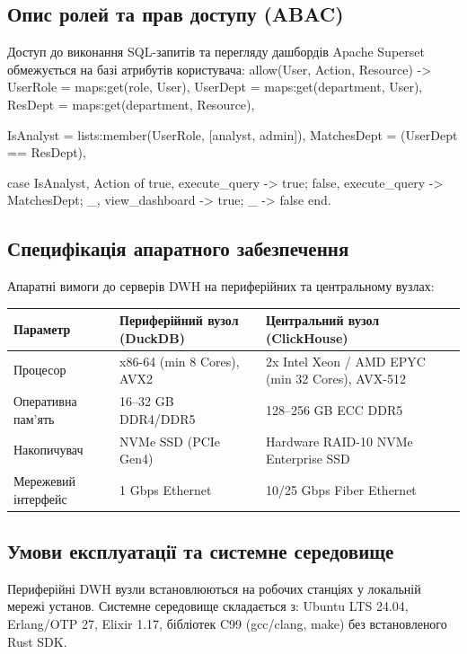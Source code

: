 \documentclass{article}
\let\originalfootnotesize\footnotesize
\let\oldverbatim\verbatim
\let\oldendverbatim\endverbatim
\renewenvironment{verbatim}{\originalfootnotesize\oldverbatim}{\oldendverbatim}
\begin{document}
\subsection{Опис ролей та прав доступу (ABAC)}
Доступ до виконання SQL-запитів та перегляду дашбордів Apache Superset обмежується на базі атрибутів користувача:
\begin{verbatim}
allow(User, Action, Resource) ->
    UserRole = maps:get(role, User),
    UserDept = maps:get(department, User),
    ResDept = maps:get(department, Resource),
    
    IsAnalyst = lists:member(UserRole, [analyst, admin]),
    MatchesDept = (UserDept == ResDept),
    
    case {IsAnalyst, Action} of
        {true, execute_query} -> true;
        {false, execute_query} -> MatchesDept;
        {_, view_dashboard} -> true;
        _ -> false
    end.
\end{verbatim}

\subsection{Специфікація апаратного забезпечення}
Апаратні вимоги до серверів DWH на периферійних та центральному вузлах:
\begin{center}
\small
\begin{longtable}{p{4cm} p{5cm} p{5cm}}
\toprule
\textbf{Параметр} & \textbf{Периферійний вузол (DuckDB)} & \textbf{Центральний вузол (ClickHouse)} \\
\midrule
Процесор & x86-64 (min 8 Cores), AVX2 & 2x Intel Xeon / AMD EPYC (min 32 Cores), AVX-512 \\
Оперативна пам'ять & 16--32 GB DDR4/DDR5 & 128--256 GB ECC DDR5 \\
Накопичувач & NVMe SSD (PCIe Gen4) & Hardware RAID-10 NVMe Enterprise SSD \\
Мережевий інтерфейс & 1 Gbps Ethernet & 10/25 Gbps Fiber Ethernet \\
\bottomrule
\end{longtable}
\end{center}

\subsection{Умови експлуатації та системне середовище}
Периферійні DWH вузли встановлюються на робочих станціях у локальній мережі установ. Системне середовище складається з: Ubuntu LTS 24.04, Erlang/OTP 27, Elixir 1.17, бібліотек C99 (gcc/clang, make) без встановленого Rust SDK.
\end{document}
